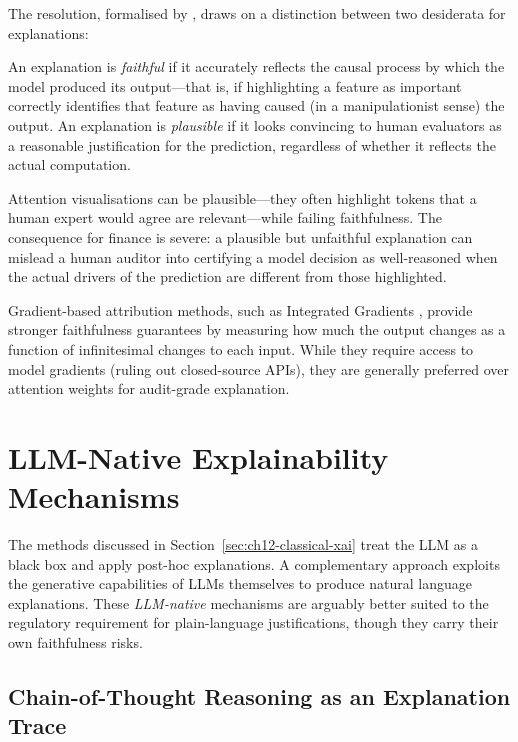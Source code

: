 The resolution, formalised by \citet{jacovi2020towards}, draws on a distinction between
two desiderata for explanations:

\begin{definition}
\label{def:faithfulness-plausibility}
An explanation is \emph{faithful} if it accurately reflects the causal process by which
the model produced its output---that is, if highlighting a feature as important correctly
identifies that feature as having caused (in a manipulationist sense) the output.
An explanation is \emph{plausible} if it looks convincing to human evaluators as a
reasonable justification for the prediction, regardless of whether it reflects the actual
computation.
\end{definition}

Attention visualisations can be plausible---they often highlight tokens that a human
expert would agree are relevant---while failing faithfulness. The consequence for finance
is severe: a plausible but unfaithful explanation can mislead a human auditor into
certifying a model decision as well-reasoned when the actual drivers of the prediction
are different from those highlighted.

Gradient-based attribution methods, such as Integrated Gradients \cite{sundararajan2017axiomatic},
provide stronger faithfulness guarantees by measuring how much the output changes as a
function of infinitesimal changes to each input. While they require access to model
gradients (ruling out closed-source APIs), they are generally preferred over attention
weights for audit-grade explanation.

\section{LLM-Native Explainability Mechanisms}
\label{sec:ch12-llm-native}

The methods discussed in Section~\ref{sec:ch12-classical-xai} treat the LLM as a black
box and apply post-hoc explanations. A complementary approach exploits the generative
capabilities of LLMs themselves to produce natural language explanations. These
\emph{LLM-native} mechanisms are arguably better suited to the regulatory requirement
for plain-language justifications, though they carry their own faithfulness risks.

\subsection{Chain-of-Thought Reasoning as an Explanation Trace}
\label{sec:ch12-chain-of-thought}

